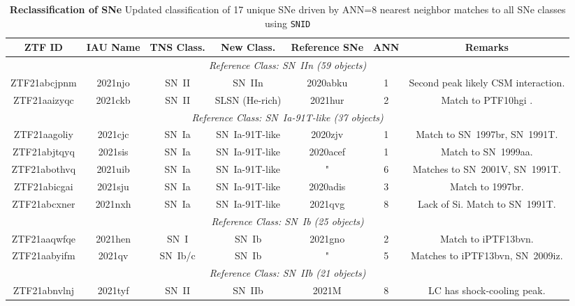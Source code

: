 \documentclass[twocolumn]{aastex63}
\begin{document}
\begin{table}[ht]
\centering
\caption{\textbf{Reclassification of SNe} Updated classification of 17 unique SNe driven by ANN=8 nearest neighbor matches to all SNe classes using \texttt{SNID}}
\begin{tabular}{ccccccc}
\hline
\hline
ZTF ID & IAU Name & TNS Class. & New Class. & Reference SNe & ANN & Remarks \\
\hline
\hline
\multicolumn{7}{c}{\textit{Reference Class: SN~IIn (59 objects)}} \\
ZTF21abcjpnm & 2021njo & SN~II & SN~IIn & 2020abku & 1 & Second peak likely CSM interaction. \\
ZTF21aaizyqc & 2021ckb & SN~II & SLSN (He-rich) & 2021hur & 2 & Match to PTF10hgi \citep{Quimby2010ATel}. \\
\hline
\multicolumn{7}{c}{\textit{Reference Class: SN~Ia-91T-like (37 objects)}} \\
ZTF21aagoliy & 2021cjc & SN~Ia & SN~Ia-91T-like & 2020zjv & 1 & Match to SN~1997br, SN~1991T. \\
ZTF21abjtqyq & 2021sis & SN~Ia & SN~Ia-91T-like & 2020acef & 1 & Match to SN~1999aa. \\
ZTF21abothvq & \cellcolor{pink} 2021uib & SN~Ia & SN~Ia-91T-like & " & 6 & Matches to SN~2001V, SN~1991T. \\
ZTF21abicgai & 2021sju & SN~Ia & SN~Ia-91T-like & 2020adis & 3 & Match to 1997br. \\
ZTF21abcxner & 2021nxh & SN~Ia & SN~Ia-91T-like & 2021qvg & 8 & Lack of Si. Match to SN~1991T. \\
\hline
\multicolumn{7}{c}{\textit{Reference Class: SN~Ib (25 objects)}} \\
ZTF21aaqwfqe & 2021hen & SN~I & SN~Ib & 2021gno & 2 & Match to iPTF13bvn. \\
ZTF21aabyifm & 2021qv & SN~Ib/c & SN~Ib & " & 5 & Matches to iPTF13bvn, SN~2009iz. \\
\hline
\multicolumn{7}{c}{\textit{Reference Class: SN~IIb (21 objects)}} \\
ZTF21abnvlnj & 2021tyf & SN~II & SN~IIb & 2021M & 8 & LC has shock-cooling peak. \\
\hline

\end{tabular}
\end{table}
\end{document}
